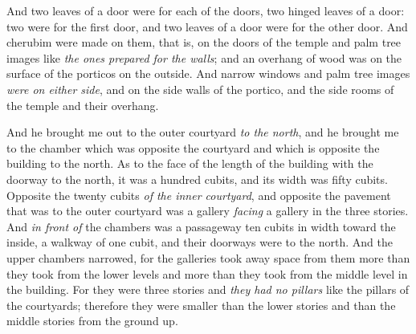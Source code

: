 \begin{biblechapter}
\verse And two leaves of a door were for each of the doors, two hinged leaves of a door: two were for the first door, and two leaves of a door were for the other door.
\verse And cherubim were made on them, that is, on the doors of the temple and palm tree images like \textit{the ones prepared for the walls}; and an overhang of wood was on the surface of the porticos on the outside.
\verse And narrow windows and palm tree images \textit{were on either side}, and on the side walls of the portico, and the side rooms of the temple and their overhang.
\end{biblechapter}

\begin{biblechapter} %
 And he brought me out to the outer courtyard \textit{to the north}, and he brought me to the chamber which was opposite the courtyard and which is opposite the building to the north.
\verse As to the face of the length of the building with the doorway to the north, it was a hundred cubits, and its width was fifty cubits.
\verse Opposite the twenty cubits \textit{of the inner courtyard}, and opposite the pavement that was to the outer courtyard was a gallery \textit{facing} a gallery in the three stories.
\verse And \textit{in front of} the chambers was a passageway ten cubits in width toward the inside, a walkway of one cubit, and their doorways were to the north.
\verse And the upper chambers narrowed, for the galleries took away space from them more than they took from the lower levels and more than they took from the middle level in the building.
\verse For they were three stories and \textit{they had no pillars} like the pillars of the courtyards; therefore they were smaller than the lower stories and than the middle stories from the ground up.

\end{biblechapter}
